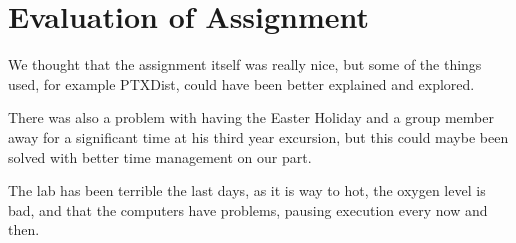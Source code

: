 \section{Evaluation of Assignment}
We thought that the assignment itself was really nice, but some of the things
used, for example PTXDist, could have been better explained and explored. 

There was also a problem with having the Easter Holiday and a group member away
for a significant time at his third year excursion, but this could maybe been
solved with better time management on our part.

The lab has been terrible the last days, as it is way to hot, the oxygen level
is bad, and that the computers have problems, pausing execution every now and
then. 

